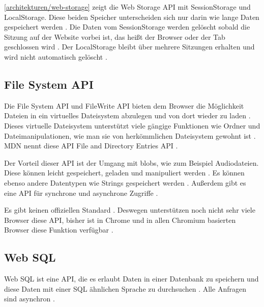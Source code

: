 
\autoref{architekturen/web-storage} zeigt die Web Storage \ac{API} mit SessionStorage und LocalStorage. Diese beiden Speicher unterscheiden sich nur darin wie lange Daten gespeichert werden \autocite{Hajian2019} \autocite{mdn-web-storage}. Die Daten vom SessionStorage werden gelöscht sobald die Sitzung auf der Website vorbei ist, das heißt der Browser oder der Tab geschlossen wird \autocite{Hajian2019} \autocite{mdn-web-storage}. Der LocalStorage bleibt über mehrere Sitzungen erhalten und wird nicht automatisch gelöscht \autocite{Hajian2019} \autocite{mdn-web-storage}.

\subsection{File System API}
Die File System \ac{API} und FileWrite \ac{API} bieten dem Browser die Möglichkeit Dateien in ein virtuelles Dateisystem abzulegen und von dort wieder zu laden \autocite{Hajian2019} \autocite{storage-for-the-web}. Dieses virtuelle Dateisystem unterstützt viele gängige Funktionen wie Ordner und Dateimanipulationen, wie man sie von herkömmlichen Dateisystem gewohnt ist \autocite{mdn-file-system}. \ac{MDN} nennt diese \ac{API} File and Directory Entries \ac{API} \autocite{mdn-file-system}. 

Der Vorteil dieser \ac{API} ist der Umgang mit \acp{blob}, wie zum Beispiel Audiodateien. Diese können leicht gespeichert, geladen und manipuliert werden \autocite{mdn-file-system}. Es können ebenso andere Datentypen wie Strings gespeichert werden \autocite{mdn-file-system}. Außerdem gibt es eine \ac{API} für synchrone und asynchrone Zugriffe \autocite{Hajian2019}. 

Es gibt keinen offiziellen Standard \autocite{mdn-file-system} \autocite{caniuse-filesystem}. Deswegen unterstützen noch nicht sehr viele Browser diese \ac{API}, bisher ist in Chrome und in allen Chromium basierten Browser diese Funktion verfügbar \autocite{caniuse-filesystem}.

\subsection{Web SQL}
Web SQL ist eine \ac{API}, die es erlaubt Daten in einer Datenbank zu speichern und diese Daten mit einer SQL ähnlichen Sprache zu durchsuchen \autocite{w3-web-sql}. Alle Anfragen sind asynchron \autocite{Hajian2019}.

